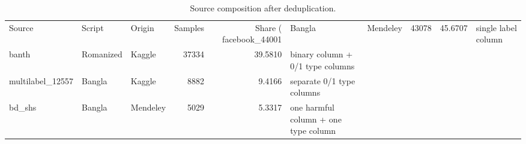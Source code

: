 \begin{table}
\caption{Source composition after deduplication.}
\label{tab:source_distribution}
\begin{tabular}{lllrrl}
\toprule
Source & Script & Origin & Samples & Share (%
\midrule
facebook_44001 & Bangla & Mendeley & 43078 & 45.6707 & single label column \\
banth & Romanized & Kaggle & 37334 & 39.5810 & binary column + 0/1 type columns \\
multilabel_12557 & Bangla & Kaggle & 8882 & 9.4166 & separate 0/1 type columns \\
bd_shs & Bangla & Mendeley & 5029 & 5.3317 & one harmful column + one type column \\
\bottomrule
\end{tabular}
\end{table}
